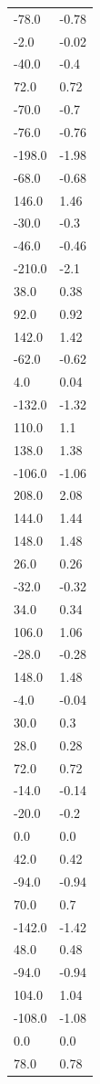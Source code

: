 \begin{longtable}{ll}
-78.0 & -0.78 \\
-2.0 & -0.02 \\
-40.0 & -0.4 \\
72.0 & 0.72 \\
-70.0 & -0.7 \\
-76.0 & -0.76 \\
-198.0 & -1.98 \\
-68.0 & -0.68 \\
146.0 & 1.46 \\
-30.0 & -0.3 \\
-46.0 & -0.46 \\
-210.0 & -2.1 \\
38.0 & 0.38 \\
92.0 & 0.92 \\
142.0 & 1.42 \\
-62.0 & -0.62 \\
4.0 & 0.04 \\
-132.0 & -1.32 \\
110.0 & 1.1 \\
138.0 & 1.38 \\
-106.0 & -1.06 \\
208.0 & 2.08 \\
144.0 & 1.44 \\
148.0 & 1.48 \\
26.0 & 0.26 \\
-32.0 & -0.32 \\
34.0 & 0.34 \\
106.0 & 1.06 \\
-28.0 & -0.28 \\
148.0 & 1.48 \\
-4.0 & -0.04 \\
30.0 & 0.3 \\
28.0 & 0.28 \\
72.0 & 0.72 \\
-14.0 & -0.14 \\
-20.0 & -0.2 \\
0.0 & 0.0 \\
42.0 & 0.42 \\
-94.0 & -0.94 \\
70.0 & 0.7 \\
-142.0 & -1.42 \\
48.0 & 0.48 \\
-94.0 & -0.94 \\
104.0 & 1.04 \\
-108.0 & -1.08 \\
0.0 & 0.0 \\
78.0 & 0.78 \\

\end{longtable}
